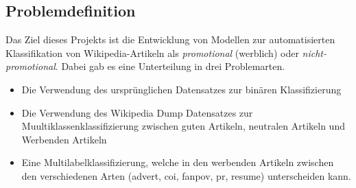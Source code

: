 \subsection{Problemdefinition}
\label{Problemdefinition}
Das Ziel dieses Projekts ist die Entwicklung von Modellen zur automatisierten Klassifikation von Wikipedia-Artikeln als \emph{promotional} (werblich) oder \emph{nicht-promotional}. Dabei gab es eine Unterteilung in drei Problemarten.
\begin{itemize}
    \item Die Verwendung des ursprünglichen Datensatzes zur binären Klassifizierung
    \item Die Verwendung des Wikipedia Dump Datensatzes zur Muultiklassenklassifizierung zwischen guten Artikeln, neutralen Artikeln und Werbenden Artikeln
    \item Eine Multilabelklassifizierung, welche in den werbenden Artikeln zwischen den verschiedenen Arten (advert, coi, fanpov, pr, resume) unterscheiden kann.
\end{itemize}



